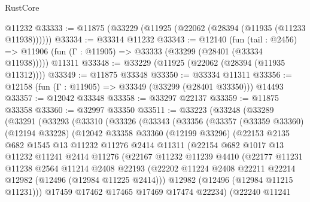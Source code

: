 \begin{lexlean}{RustCore}
\begin{coremodule}
    @11232
@33333 := @11875 (@33229 (@11925 (@22062 (@28394 (@11935 (@11233 @11938))))))
@33334 := @33314 @11232
@33343 := @12140
    (fun (tail : @2456) => @11906 (fun (Γ : @11905) => @33333 (@33299 (@28401 (@33334 @11938)))))
    @11311
@33348 := @33229 (@11925 (@22062 (@28394 (@11935 @11312))))
@33349 := @11875 @33348
@33350 := @33334 @11311
@33356 := @12158 (fun (Γ : @11905) => @33349 (@33299 (@28401 @33350))) @14493
@33357 := @12042 @33348
@33358 := @33297 @22137
@33359 := @11875 @33358
@33360 := @32997 @33350
@33511 := @33223
    (@33248
      (@33289
        (@33291
          (@33293
            (@33310
              (@33326
                (@33343
                  (@33356
                    (@33357
                      (@33359 @33360)
                      (@12194 @33228)
                      (@12042
                        @33358
                        @33360
                        (@12199 @33296)
                        (@22153
                          @2135
                          @682
                          @1545
                          @13
                          @11232
                          @11276
                          @2414
                          @11311
                          (@22154
                            @682
                            @1017
                            @13
                            @11232
                            @11241
                            @2414
                            @11276
                            (@22167
                              @11232
                              @11239
                              @4410
                              (@22177
                                @11231
                                @11238
                                @2564
                                @11214
                                @2408
                                @22193
                                (@22202
                                  @11224
                                  @2408
                                  @22211
                                  @22214
                                  @12982
                                  (@12496 (@12984 @11225 @2414)))
                                @12982
                                (@12496 (@12984 @11215 @11231)))
                              @17459
                              @17462
                              @17465
                              @17469
                              @17474
                              @22234)
                            (@22240
                              @11241

\end{coremodule}
\end{lexlean}
